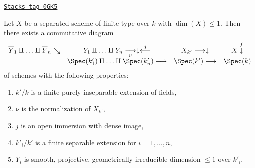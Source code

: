 \begin{lemma}
\label{varieties-lemma-dim-1-projective-completion-after-insep}
\href{https://stacks.math.columbia.edu/tag/0GK5}{\texttt{Stacks tag 0GK5}}

Let $X$ be a separated scheme of finite type over $k$ with $\dim(X) \leq 1$.
Then there exists a commutative diagram
$$
\begin{array}{cccc}\overline{Y}_1 \amalg \ldots \amalg \overline{Y}_n \searrow & Y_1 \amalg \ldots \amalg Y_n \underset{\nu}{\longrightarrow}\downarrow\overset{j}{\longleftarrow} & X_{k'} \longrightarrow\downarrow & X \overset{f}{\downarrow} \\  & \Spec(k'_1) \amalg \ldots \amalg \Spec(k'_n) \longrightarrow & \Spec(k') \longrightarrow & \Spec(k)\end{array}
$$
of schemes with the following properties:
\begin{enumerate}
\item $k'/k$ is a finite purely inseparable extension of fields,
\item $\nu$ is the normalization of $X_{k'}$,
\item $j$ is an open immersion with dense image,
\item $k'_i/k'$ is a finite separable extension for $i = 1, \ldots, n$,
\item $\overline{Y}_i$ is smooth, projective, geometrically irreducible
dimension $\leq 1$ over $k'_i$.
\end{enumerate}
\end{lemma}

